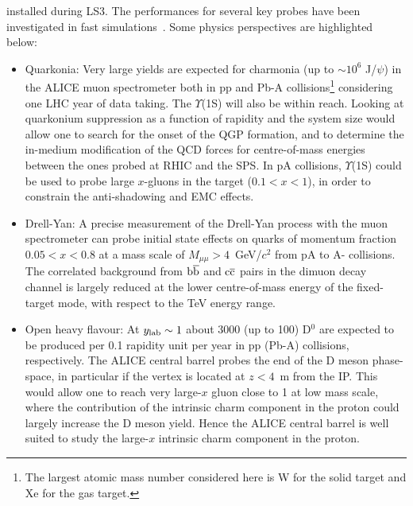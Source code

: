 \documentclass[../report.tex]{subfiles}
\begin{document}
installed during LS3. The performances for several key probes have been investigated in fast simulations~\cite{Hadjidakis:2018ifr}. Some physics perspectives are highlighted below: 
\begin{itemize}
\item{Quarkonia: Very large yields are expected for charmonia (up to $\sim 10^{6}$ J/$\psi$) in the ALICE muon spectrometer both in pp and Pb-A collisions\footnote{The largest atomic mass number considered here is W for the solid target and Xe for the gas target.} considering one LHC year of data taking. The $\Upsilon$(1S) will also be within reach. Looking at quarkonium suppression as a function of rapidity and the system size would allow one to search for the onset of the QGP formation, and to determine the in-medium modification of the QCD forces for centre-of-mass energies between the ones probed at RHIC and the SPS. In pA collisions, $\Upsilon$(1S) could be used to probe large $x$-gluons in the target ($0.1<x<1$), in order to constrain the anti-shadowing and EMC effects.}

\item{Drell-Yan: A precise measurement of the Drell-Yan process with the muon spectrometer can probe initial state effects on quarks of momentum fraction $0.05<x<0.8$ at a mass scale of $M_{\mu\mu}> 4$~GeV/$c^2$ from pA to A- collisions. The correlated background from $\rm b\overline{b}$ and $\rm c\overline{c}$ pairs in the dimuon decay channel is largely reduced at the lower centre-of-mass energy of the fixed-target mode, with respect to the TeV energy range.}

\item{Open heavy flavour: At $y_{\rm lab} \sim 1$ about 3000 (up to 100) D$^{0}$ are expected to be produced per 0.1 rapidity unit per year in pp (Pb-A) collisions, respectively. The ALICE central barrel probes the end of the D meson phase-space, in particular if the vertex is located at $z < 4$~m from the IP. This would allow one to reach very large-$x$ gluon close to 1 at low mass scale, where the contribution of the intrinsic charm component in the proton could largely increase the D meson yield. Hence the ALICE central barrel is well suited to study the large-$x$ intrinsic charm component in the proton.}


\end{itemize}
\end{document}
